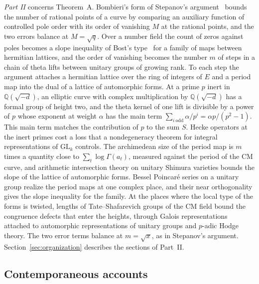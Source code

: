 \emph{Part II} concerns Theorem~A. Bombieri's form of Stepanov's argument~\cite{bombieri} bounds the number of rational points of a curve by comparing an auxiliary function of controlled pole order with its order of vanishing $M$ at the rational points, and the two errors balance at $M=\sqrt q$. Over a number field the count of zeros against poles becomes a slope inequality of Bost's type~\cite{bost} for a family of maps between hermitian lattices, and the order of vanishing becomes the number $m$ of steps in a chain of theta lifts between unitary groups of growing rank. To each step the argument attaches a hermitian lattice over the ring of integers of $E$ and a period map into the dual of a lattice of automorphic forms. At a prime $p$ inert in $\mathbb Q(\sqrt{-d})$, an elliptic curve with complex multiplication by $\mathbb Q(\sqrt{-d})$ has a formal group of height two, and the theta kernel of one lift is divisible by a power of $p$ whose exponent at weight $\alpha$ has the main term $\sum_{i\ \mathrm{odd}}\alpha/p^i=\alpha p/(p^2-1)$. This main term matches the contribution of $p$ to the sum $S$. Hecke operators at the inert primes cost a loss that a nondegeneracy theorem for integral representations of $\mathrm{GL}_k$ controls. The archimedean size of the period map is $m$ times a quantity close to $\sum_t\log\Gamma(a_t)$, measured against the period of the CM curve, and arithmetic intersection theory on unitary Shimura varieties bounds the slope of the lattice of automorphic forms. Bessel Poincar\'e series on a unitary group realize the period maps at one complex place, and their near orthogonality gives the slope inequality for the family. At the places where the local type of the forms is twisted, lengths of Tate--Shafarevich groups of the CM field bound the congruence defects that enter the heights, through Galois representations attached to automorphic representations of unitary groups and $p$-adic Hodge theory. The two error terms balance at $m=\sqrt x$, as in Stepanov's argument. Section~\ref{sec:organization} describes the sections of Part~II.

\subsection{Contemporaneous accounts}

